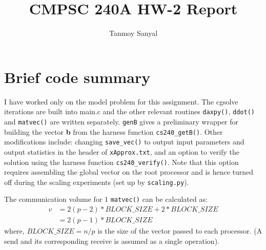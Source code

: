 \documentclass[12pt,letterpaper]{article}
\author{Tanmoy Sanyal}
\title{CMPSC 240A HW-2 Report}
\begin{document}
\maketitle

\section*{Brief code summary}
\noindent I have worked only on the model problem for this assignment. The cgsolve iterations are built into main.c and the other relevant routines \texttt{daxpy()}, \texttt{ddot()} and \texttt{matvec()} are written separately. \texttt{genB} gives a preliminary wrapper for building the vector \textbf{b} from the harness function \texttt{cs240\_getB()}. Other modifications include: changing \texttt{save\_vec()} to output input parameters and output statistics in the header of \texttt{xApprox.txt}, and an option to verify the solution using the harness function \texttt{cs240\_verify()}. Note that this option requires assembling the global vector on the root processor and is hence turned off during the scaling experiments (set up by \texttt{scaling.py}).

\noindent The communication volume for 1 \texttt{matvec()} can be calculated as:
\begin{align*}
v & = 2(p-2) * BLOCK\_SIZE + 2 * BLOCK\_SIZE \\
  & = 2(p-1)*BLOCK\_SIZE
\end{align*}
\noindent where, $BLOCK\_SIZE = n/p$ is the size of the vector passed to each processor. (A send and its corresponding receive is assumed as a single operation).
\end{document}
